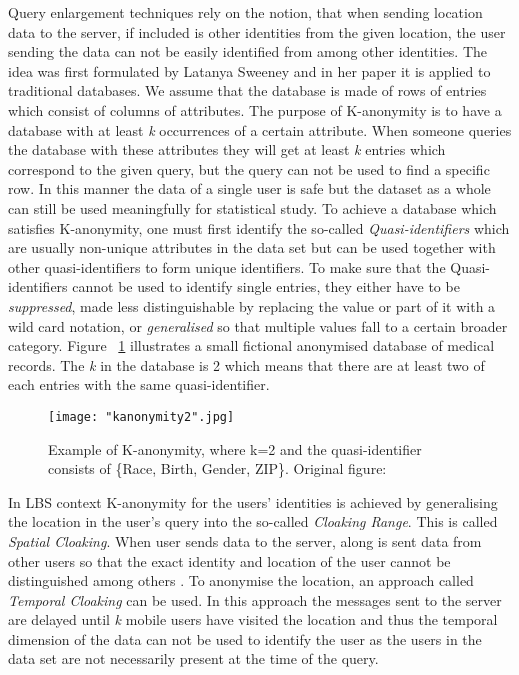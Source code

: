 \documentclass[english]{tktltiki2}
\theoremstyle{definition}
\theoremstyle{remark}
\begin{document}
Query enlargement techniques rely on the notion, that when sending location data to the server, if included is other identities from the given location, the user sending the data can not be easily identified from among other identities. The idea was first formulated by Latanya Sweeney\cite{Sweeney:2002:KAM:774544.774552} and in her paper it is applied to traditional databases. We assume that the database is made of rows of entries which consist of columns of attributes. The purpose of K-anonymity is to have a database with at least \textit{k} occurrences of a certain attribute. When someone queries the database with these attributes they will get at least \textit{k} entries which correspond to the given query, but the query can not be used to find a specific row. In this manner the data of a single user is safe but the dataset as a whole can still be used meaningfully for statistical study. To achieve a database which satisfies K-anonymity, one must first identify the so-called \textit{Quasi-identifiers} which are usually non-unique attributes in the data set but can be used together with other quasi-identifiers to form unique identifiers. To make sure that the Quasi-identifiers cannot be used to identify single entries, they either have to be \textit{suppressed}, made less distinguishable by replacing the value or part of it with a wild card notation, or \textit{generalised} so that multiple values fall to a certain broader category. Figure ~\ref{fig:kanonymity2} illustrates a small fictional anonymised database of medical records. The \textit{k} in the database is 2 which means that there are at least two of each entries with the same quasi-identifier.

\begin{figure}[H]
\centering
{}
\texttt{[image: "kanonymity2".jpg]}
\caption{Example of K-anonymity, where k=2 and the quasi-identifier consists of \{Race, Birth, Gender, ZIP\}. Original figure: \cite{Sweeney:2002:KAM:774544.774552} }
\label{fig:kanonymity2}
\end{figure} 

In LBS context K-anonymity for the users' identities is achieved by generalising the location in the user's query into the so-called \textit{Cloaking Range}. This is called \textit{Spatial Cloaking}. When user sends data to the server, along is sent data from other users so that the exact identity and location of the user cannot be distinguished among others \cite{Gedik2008}. To anonymise the location, an approach called \textit{Temporal Cloaking} can be used. In this approach the messages sent to the server are delayed until \textit{k} mobile users have visited the location and thus the temporal dimension of the data can not be used to identify the user as the users in the data set are not necessarily present at the time of the query.
\end{document}
